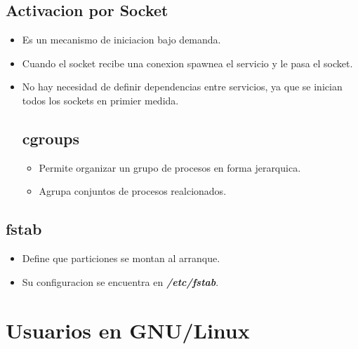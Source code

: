 \documentclass[11pt]{article}
\begin{document}
\subsection{Activacion por Socket}
\begin{itemize}
    \item Es un mecanismo de iniciacion bajo demanda.
    \item Cuando el socket recibe una conexion spawnea el servicio y le pasa el socket.
    \item No hay necesidad de definir dependencias entre servicios, ya que se inician todos los sockets en primier medida.

\subsection{cgroups}
\begin{itemize}
    \item Permite organizar un grupo de procesos en forma jerarquica.
    \item Agrupa conjuntos de procesos realcionados.
\end{itemize}
\end{itemize}

\subsection{fstab}

\begin{itemize}
    \item Define que particiones se montan al arranque.
    \item Su configuracion se encuentra en \textbf{\textit{/etc/fstab}}.
\end{itemize}

\section{Usuarios en GNU/Linux}
\end{document}
